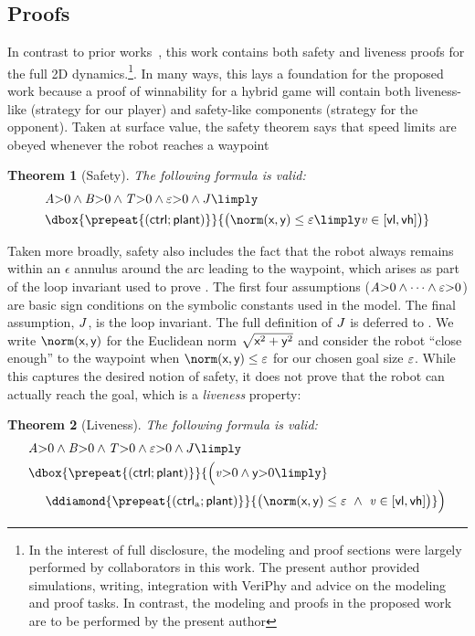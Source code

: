\documentclass[12pt]{cmuthesis}
\newtheorem{theorem}{Theorem}
\theoremstyle{definition}
\theoremstyle{remark}
\newcommand{\rref}[2][]{\prettyref{#2}}
\newcommand{\VeriPhy}{VeriPhy\xspace}
\begin{document}
\subsection{Proofs}
In contrast to prior works~\cite{DBLP:journals/ijrr/MitschGVP17}, this work contains both safety and liveness proofs for the full 2D dynamics.\footnote{In the interest of full disclosure, the modeling and proof sections were largely performed by collaborators in this work. The present author provided simulations, writing, integration with \VeriPhy and advice on the modeling and proof tasks. In contrast, the modeling and proofs in the proposed work are to be performed by the present author}.
In many ways, this lays a foundation for the proposed work because a proof of winnability for a hybrid game will contain both liveness-like (strategy for our player) and safety-like components (strategy for the opponent).
Taken at surface value, the safety theorem says that speed limits are obeyed whenever the robot reaches a waypoint
\begin{theorem}[Safety]
\label{thm:safe}
The following \dL formula is valid:
\begin{align*}
&\Avar{>}0 \land \Bvar{>}0 \land \Tvar{>}0 \land \veps{>}0 \land \linv \limply \\
&\dbox{\prepeat{(\ctrl;\plant)}}{\big(\enorm{(\xgvar,\ygvar)} \leq \veps \limply \vvar \in [\vlvar,\vhvar]\big)}
\end{align*}
\end{theorem}
Taken more broadly, safety also includes the fact that the robot always remains within an $\epsilon$ annulus around the arc leading to the waypoint, which arises as part of the loop invariant used to prove \rref{thm:safe}.
The first four assumptions (${\it A}{>}0 \land \dots \land \varepsilon{>}0$) are basic sign conditions on the symbolic constants used in the model. 
The final assumption, $J$, is the loop invariant.
The full definition of $J$ is deferred to \rref{sec:robostage}.
We write $\enorm{(\xgvar,\ygvar)}$ for the Euclidean norm $\sqrt{\textsf{x}^2 + \textsf{y}^2}$ and consider the robot ``close enough'' to the waypoint when $\enorm{(\xgvar,\ygvar)} \leq \veps$ for our chosen goal size $\varepsilon$.
While this captures the desired notion of safety, it does not prove that the robot can actually reach the goal, which is a \emph{liveness} property:
\begin{theorem}[Liveness]
\label{thm:liveness}
The following \dL formula is valid:
\begin{align*}
&\Avar{>}0 \land \Bvar{>}0 \land \Tvar{>}0 \land \veps{>}0 \land \linv \limply \\
&\dbox{\prepeat{(\ctrl;\plant)}}{\Big( \vvar{>}0 \land \yvar{>}0 \limply }\\
&\ \ \ \ \ddiamond{\prepeat{(\ctrlliv;\plant)}}{\big(\enorm{(\xgvar,\ygvar)} \leq \veps~\land~\vvar \in [\vlvar,\vhvar]\big)} \Big)
\end{align*}
\end{theorem}
\end{document}
